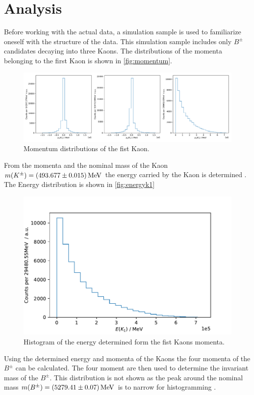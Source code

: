 \section{Analysis}
\label{sec:Analysis}

Before working with the actual data, a simulation sample is used to familiarize oneself with the structure of the data. This simulation sample includes only $B^\pm$ candidates decaying into three Kaons. The distributions of the momenta belonging to the first Kaon is shown in \autoref{fig:momentum}. 

\begin{figure}
	\centering
	\includegraphics[width=0.9\linewidth]{content/pictures/image_fin/momentum}
	\caption{Momentum distributions of the fist Kaon.}
	\label{fig:momentum}
\end{figure}


From the momenta and the nominal mass of the Kaon $m(K^\pm) = \qty{493.677 \pm 0.015}{\mega\eV }$  the energy carried by the Kaon is determined \cite{pdg}. The Energy distribution is shown in \autoref{fig:energyk1}

\begin{figure}
	\centering
	\includegraphics[width=0.6\linewidth]{content/pictures/image_fin/energyK1}
	\caption{Histogram of the energy determined form the fist Kaons momenta.}
	\label{fig:energyk1}
\end{figure}


Using the determined energy and momenta of the Kaons the four momenta of the $B^\pm$ can be calculated. The four moment are then used to determine the invariant mass of the $B^\pm$. This distribution is not shown as the peak around the nominal mass $m(B^\pm) = \qty{5279.41\pm0.07}{\mega\eV}$ is to narrow for histogramming \cite{pdg}. \\


